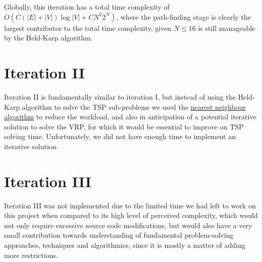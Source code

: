 Globally, this iteration has a total time complexity of $O(C(|E|+|V|) \log |V| + C N^2 2^N)$, where the path-finding stage is clearly the largest contributor to the total time complexity, given $N \leq 16$ is still manageable by the Held-Karp algorithm.
\section{Iteration II}
Iteration II is fundamentally similar to iteration I, but instead of using the Held-Karp algorithm to solve the \acrshort{TSP} sub-problems we used the \hyperref[algorithm-tsp-nn]{nearest neighbour algorithm} to reduce the workload, and also in anticipation of a potential iterative solution to solve the \acrshort{VRP}, for which it would be essential to improve on \acrshort{TSP} solving time. Unfortunately, we did not have enough time to implement an iterative solution.

\section{Iteration III}
Iteration III was not implemented due to the limited time we had left to work on this project when compared to its high level of perceived complexity, which would not only require excessive source code modifications, but would also have a very small contribution towards understanding of fundamental problem-solving approaches, techniques and algorithmics, since it is mostly a matter of adding more restrictions.
